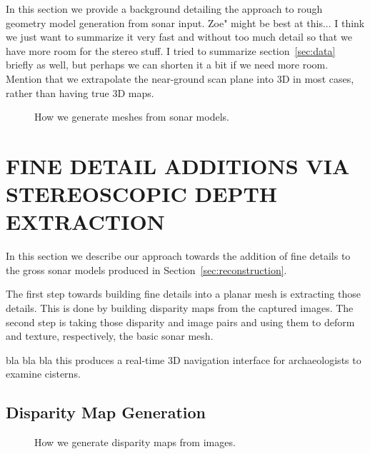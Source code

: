 \documentclass[a4paper,twoside]{article}
\begin{document}
\noindent In this section we provide a background detailing the approach to rough geometry model generation from sonar input. Zoe" might be best at this... I think we just want to summarize it very fast and without too much detail so that we have more room for the stereo stuff. I tried to summarize section~\ref{sec:data} briefly as well, but perhaps we can shorten it a bit if we need more room. Mention that we extrapolate the near-ground scan plane into 3D in most cases, rather than having true 3D maps.

\begin{figure*}[!ht]
   \vspace{-0.2cm}
   \caption{How we generate meshes from sonar models.}
  \label{fig:meshgen}
 \end{figure*}

\section{\uppercase{Fine Detail Additions Via Stereoscopic Depth Extraction}}
\label{sec:detail}

\noindent In this section we describe our approach towards the addition of fine details to the gross sonar models produced in Section~\ref{sec:reconstruction}. 

The first step towards building fine details into a planar mesh is extracting those details. 
This is done by building disparity maps from the captured images.
The second step is taking those disparity and image pairs and using them to deform and texture, respectively, the basic sonar mesh. 

\noindent bla bla bla this produces a real-time 3D navigation interface for archaeologists to examine cisterns.


\subsection{Disparity Map Generation}

\begin{figure*}[!ht]
   \vspace{-0.2cm}
   \caption{How we generate disparity maps from images.}
  \label{fig:dispgen}
 \end{figure*}
\end{document}
